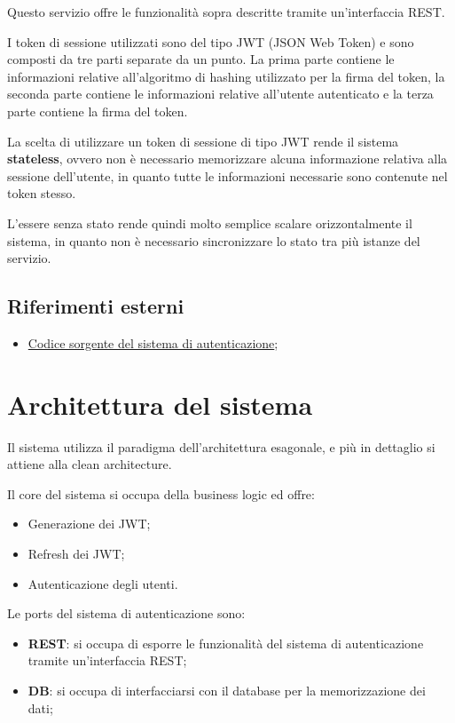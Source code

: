 Questo servizio offre le funzionalità sopra descritte tramite un'interfaccia REST.

I token di sessione utilizzati sono del tipo JWT (JSON Web Token) e sono composti da tre parti separate da un punto. La prima parte contiene le informazioni relative all'algoritmo di hashing utilizzato per la firma del token, la seconda parte contiene le informazioni relative all'utente autenticato e la terza parte contiene la firma del token.

La scelta di utilizzare un token di sessione di tipo JWT rende il sistema \textbf{stateless}, ovvero non è necessario memorizzare alcuna informazione relativa alla sessione dell'utente, in quanto tutte le informazioni necessarie sono contenute nel token stesso.

L'essere senza stato rende quindi molto semplice scalare orizzontalmente il sistema, in quanto non è necessario sincronizzare lo stato tra più istanze del servizio.

\subsection{Riferimenti esterni}

\begin{itemize}
    \item \href{https://github.com/SWEasabi/authentication-micro-service}{Codice sorgente del sistema di autenticazione};
\end{itemize}

\section{Architettura del sistema}

Il sistema utilizza il paradigma dell'architettura esagonale, e più in dettaglio si attiene alla clean architecture.

Il core del sistema si occupa della business logic ed offre:
\begin{itemize}
    \item Generazione dei JWT;
    \item Refresh dei JWT;
    \item Autenticazione degli utenti.
\end{itemize}

Le ports del sistema di autenticazione sono:
\begin{itemize}
    \item \textbf{REST}: si occupa di esporre le funzionalità del sistema di autenticazione tramite un'interfaccia REST;
    \item \textbf{DB}: si occupa di interfacciarsi con il database per la memorizzazione dei dati;
\end{itemize}

